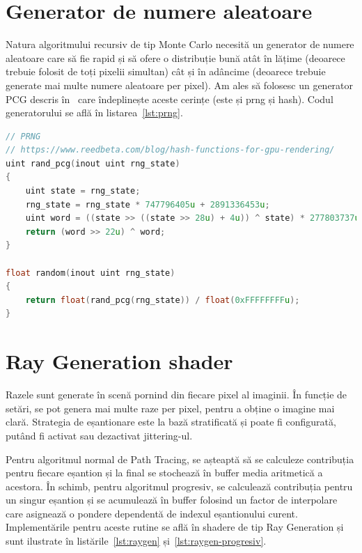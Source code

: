 \documentclass[12pt,a4paper]{report}
\numberwithin{equation}{section} %
\begin{document}
\section{Generator de numere aleatoare}

Natura algoritmului recursiv de tip Monte Carlo necesită un generator de numere
aleatoare care să fie rapid și să ofere o distribuție bună atât în lățime (deoarece
trebuie folosit de toți pixelii simultan) cât și în adâncime (deoarece trebuie
generate mai multe numere aleatoare per pixel). Am ales să folosesc un generator
PCG descris în~\cite{prng} care îndeplinește aceste cerințe (este și prng și hash). Codul
generatorului se află în listarea~\ref{lst:prng}.
\begin{lstlisting}[caption={Generatorul de numere aleatoare PCG\protect\footnotemark},label={lst:prng},language=C++]
// PRNG
// https://www.reedbeta.com/blog/hash-functions-for-gpu-rendering/
uint rand_pcg(inout uint rng_state)
{
	uint state = rng_state;
	rng_state = rng_state * 747796405u + 2891336453u;
	uint word = ((state >> ((state >> 28u) + 4u)) ^ state) * 277803737u;
	return (word >> 22u) ^ word;
}

float random(inout uint rng_state)
{
	return float(rand_pcg(rng_state)) / float(0xFFFFFFFFu);
}
\end{lstlisting}

\section{Ray Generation shader}

Razele sunt generate în scenă pornind din fiecare pixel al imaginii. În funcție
de setări, se pot genera mai multe raze per pixel, pentru a obține o imagine
mai clară. Strategia de eșantionare este la bază stratificată și poate fi configurată,
putând fi activat sau dezactivat jittering-ul.

Pentru algoritmul normal de Path Tracing, se așteaptă să se calculeze
contribuția pentru fiecare eșantion și la final se stochează în buffer
media aritmetică a acestora. În schimb, pentru algoritmul progresiv, se
calculează contribuția pentru un singur eșantion și se acumulează în buffer
folosind un factor de interpolare care asignează o pondere dependentă de
indexul eșantionului curent. Implementările pentru aceste rutine se află în
shadere de tip Ray Generation și sunt ilustrate în listările~\ref{lst:raygen} și~\ref{lst:raygen-progresiv}.
\end{document}
